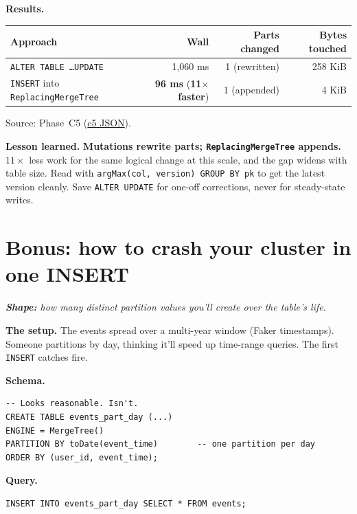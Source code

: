 \documentclass[11pt]{article}
\renewcommand{\arraystretch}{1.15}
\newcommand{\shape}[1]{%
  \par\noindent\textit{\textbf{Shape:} #1}\par\smallskip}
\newcommand{\schemaHd}{%
  \par\smallskip\noindent\textbf{\color{accentblue}Schema.}\par\nopagebreak\smallskip}
\newcommand{\queryHd}{%
  \par\smallskip\noindent\textbf{\color{accentblue}Query.}\par\nopagebreak\smallskip}
\newcommand{\resultsHd}{%
  \par\smallskip\noindent\textbf{\color{accentblue}Results.}\par\nopagebreak\smallskip}
\newcommand{\lesson}[1]{%
  \par\medskip
  \begin{lessonbox}\textbf{\color{accentgreen}Lesson learned.}\enspace #1\end{lessonbox}}
\begin{document}
\resultsHd
\renewcommand{\arraystretch}{1.20}
\begin{tabularx}{\linewidth}{@{}X r r r@{}}
\toprule
\textbf{Approach}                       & \textbf{Wall} & \textbf{Parts changed} & \textbf{Bytes touched}\\
\midrule
\texttt{ALTER TABLE \ldots UPDATE}      & 1{,}060 ms    & 1 (rewritten)         & 258 KiB\\
\rowcolor{accentgreen!12}\texttt{INSERT} into \texttt{ReplacingMergeTree}
                                        & \textbf{96 ms} (\textbf{11$\times$ faster}) & 1 (appended) & 4 KiB\\
\bottomrule
\end{tabularx}

\smallskip
Source: Phase~C5
(\href{run:results/experiment_c5_mutation_cost_20260503_192410.json}{c5 JSON}).

\lesson{%
\textbf{Mutations rewrite parts; \texttt{ReplacingMergeTree} appends.}
$11\times$ less work for the same logical change at this scale, and
the gap widens with table size. Read with \texttt{argMax(col, version)
GROUP BY pk} to get the latest version cleanly. Save \texttt{ALTER UPDATE}
for one-off corrections, never for steady-state writes.}

\section*{Bonus: how to crash your cluster in one INSERT}

\shape{how many distinct partition values you'll create over the table's life.}

\textbf{The setup.}
The events spread over a multi-year window (Faker timestamps).
Someone partitions by day, thinking it'll speed up time-range queries.
The first \texttt{INSERT} catches fire.

\schemaHd
\begin{lstlisting}
-- Looks reasonable. Isn't.
CREATE TABLE events_part_day (...)
ENGINE = MergeTree()
PARTITION BY toDate(event_time)        -- one partition per day
ORDER BY (user_id, event_time);
\end{lstlisting}

\queryHd
\begin{lstlisting}
INSERT INTO events_part_day SELECT * FROM events;
\end{lstlisting}
\end{document}
